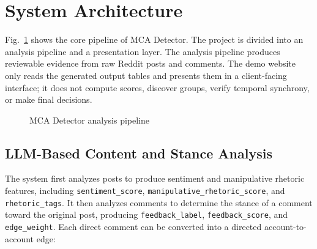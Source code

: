 \documentclass[conference]{IEEEtran}
\begin{document}
\section{System Architecture}

Fig.~\ref{fig:pipeline-en} shows the core pipeline of MCA Detector. The project is divided into an analysis pipeline and a presentation layer. The analysis pipeline produces reviewable evidence from raw Reddit posts and comments. The demo website only reads the generated output tables and presents them in a client-facing interface; it does not compute scores, discover groups, verify temporal synchrony, or make final decisions.

\begin{figure}[htbp]
  \centering
  \caption{MCA Detector analysis pipeline}
  \label{fig:pipeline-en}
\end{figure}

\subsection{LLM-Based Content and Stance Analysis}

The system first analyzes posts to produce sentiment and manipulative rhetoric features, including \texttt{sentiment\_score}, \texttt{manipulative\_rhetoric\_score}, and \texttt{rhetoric\_tags}. It then analyzes comments to determine the stance of a comment toward the original post, producing \texttt{feedback\_label}, \texttt{feedback\_score}, and \texttt{edge\_weight}. Each direct comment can be converted into a directed account-to-account edge:
\end{document}
